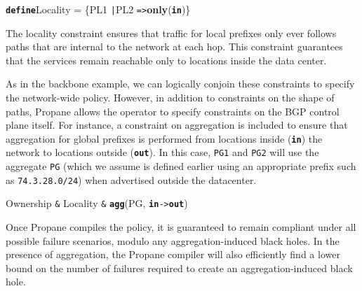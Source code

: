 \documentclass[10pt]{sigalternate052015}
\newcommand{\sysname}{{\small \sf Propane}\xspace}
\newcommand{\CD}[1]{\texttt{\small #1}}  %
\newcommand{\KW}[1]{\texttt{\small\bfseries{#1}}}
\newcommand{\Define}{\KW{define}}
\newcommand{\Path}{\texttt{=>}}
\newcommand{\Link}{\texttt{->}}
\newcommand{\Agg}{\KW{agg}}
\newcommand{\Any}{\KW{any}}
\newcommand{\In}{\KW{in}}
\newcommand{\Out}{\KW{out}}
\newcommand{\AND}{\texttt{\&}}
\newcommand{\OR}{\texttt{|}}
\newcommand{\NOT}{\texttt{!}}
\renewcommand{\path}[2]{ #1 \mapsto \ensuremath{#2} }
\begin{document}
\begin{code}
\Define Locality = 
    \{PL1 \OR PL2 \Path \textbf{only}(\In)\}
\end{code}
\noindent
The locality constraint ensures that traffic for local
prefixes only ever follows paths that are internal to the network at each hop. 
This constraint guarantees that the services remain reachable only to locations
inside the data center.

As in the backbone example, we can logically conjoin these constraints
to specify the network-wide policy.
However, in addition to constraints on the shape of paths,
\sysname allows the operator to specify constraints on the BGP control plane itself.
For instance, a constraint on aggregation is included to ensure that
aggregation for global prefixes is performed from
locations inside (\In) the network to locations outside (\Out). 
In this case, \CD{PG1} and \CD{PG2} will use the aggregate \CD{PG} 
(which we assume is defined earlier using an appropriate prefix such 
as \CD{74.3.28.0/24})
when advertised outside the datacenter.

\begin{code}
Ownership \AND{} Locality \AND{} \Agg(PG, \In \Link \Out)
\end{code}

Once \sysname compiles the policy, it is guaranteed to remain compliant under all possible failure scenarios, modulo any aggregation-induced black holes. In the presence of aggregation, the \sysname compiler will also efficiently find a lower bound on the number of failures required to create an aggregation-induced black hole.
\end{document}
